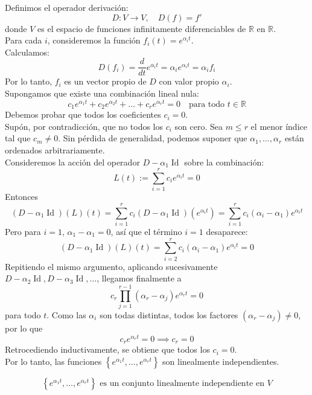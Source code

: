 \documentclass{article}
\theoremstyle{nonumberplain}
\begin{document}
Definimos el operador derivación:
\[
D: V \to V, \quad D(f) = f'
\]
donde \( V \) es el espacio de funciones infinitamente diferenciables de \( \mathbb{R} \) en \( \mathbb{R} \).\\

Para cada \( i \), consideremos la función \( f_i(t) = e^{\alpha_i t} \).  \\
Calculamos:
\[
D(f_i) = \frac{d}{dt}e^{\alpha_i t} = \alpha_i e^{\alpha_i t} = \alpha_i f_i
\]
Por lo tanto, \( f_i \) es un vector propio de \( D \) con valor propio \( \alpha_i \). \\

Supongamos que existe una combinación lineal nula:
\[
c_1 e^{\alpha_1 t} + c_2 e^{\alpha_2 t} + \ldots + c_r e^{\alpha_r t} = 0 \quad \text{para todo } t \in \mathbb{R}
\]
Debemos probar que todos los coeficientes \( c_i = 0 \).\\

Supón, por contradicción, que no todos los \( c_i \) son cero. Sea \( m \leq r \) el menor índice tal que \( c_m \neq 0 \). Sin pérdida de generalidad, podemos suponer que \( \alpha_1, \dots, \alpha_r \) están ordenados arbitrariamente.\\

Consideremos la acción del operador \( D-\alpha_1 \operatorname{Id} \) sobre la combinación:
\[
L(t) := \sum_{i=1}^r c_i e^{\alpha_i t} = 0
\]
Entonces
\[
(D - \alpha_1 \operatorname{Id})(L)(t) = \sum_{i=1}^r c_i (D - \alpha_1 \operatorname{Id})(e^{\alpha_i t}) = \sum_{i=1}^r c_i (\alpha_i - \alpha_1) e^{\alpha_i t}
\]
Pero para \( i=1 \), \( \alpha_1 - \alpha_1 = 0 \), así que el término \( i=1 \) desaparece:
\[
(D - \alpha_1 \operatorname{Id})(L)(t) = \sum_{i=2}^r c_i (\alpha_i - \alpha_1) e^{\alpha_i t} = 0
\]
Repitiendo el mismo argumento, aplicando sucesivamente \( D - \alpha_2 \operatorname{Id}, D - \alpha_3 \operatorname{Id}, \ldots \), llegamos finalmente a
\[
c_r \prod_{j=1}^{r-1} (\alpha_r - \alpha_j) e^{\alpha_r t} = 0
\]
para todo \( t \). Como las \( \alpha_i \) son todas distintas, todos los factores \( (\alpha_r - \alpha_j) \neq 0 \), por lo que
\[
c_r e^{\alpha_r t} = 0 \implies c_r = 0
\]
Retrocediendo inductivamente, se obtiene que todos los \( c_i = 0 \).\\

Por lo tanto, las funciones \( \left\{e^{\alpha_{1} t}, \ldots, e^{\alpha_{r} t}\right\} \) son linealmente independientes.

\[
\boxed{
\left\{e^{\alpha_{1} t}, \ldots, e^{\alpha_{r} t}\right\} \text{ es un conjunto linealmente independiente en } V
}
\]
\end{document}
